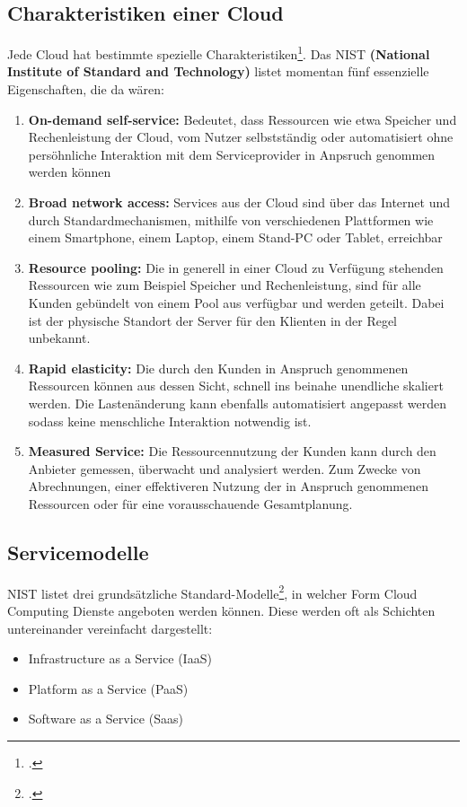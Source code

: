 \subsection{Charakteristiken einer Cloud}
Jede Cloud hat bestimmte spezielle Charakteristiken\footcite{cloud-computing}. Das NIST \textbf{(National Institute of Standard and Technology)} listet
momentan fünf essenzielle Eigenschaften, die da wären:
\begin{enumerate}
	\item \textbf{On-demand self-service: } Bedeutet, dass Ressourcen wie etwa Speicher und Rechenleistung der Cloud, vom Nutzer selbstständig oder automatisiert 
ohne persöhnliche Interaktion mit dem Serviceprovider in Anpsruch genommen werden können
	\item \textbf{Broad network access: } Services aus der Cloud sind über das Internet und durch Standardmechanismen, mithilfe von verschiedenen Plattformen wie einem Smartphone, einem Laptop, einem Stand-PC oder Tablet, erreichbar
	\item \textbf{Resource pooling: } Die in generell in einer Cloud zu Verfügung stehenden Ressourcen wie zum Beispiel Speicher und Rechenleistung, sind für alle Kunden gebündelt von einem Pool aus verfügbar und werden geteilt. Dabei ist der physische Standort der Server für den Klienten in der Regel unbekannt.
	\item \textbf{Rapid elasticity: } Die durch den Kunden in Anspruch genommenen Ressourcen können aus dessen Sicht, schnell ins beinahe unendliche skaliert werden. Die Lastenänderung
kann ebenfalls automatisiert angepasst werden sodass keine menschliche Interaktion notwendig ist.
	\item \textbf{Measured Service: } Die Ressourcennutzung der Kunden kann durch den Anbieter gemessen, überwacht und analysiert werden. Zum Zwecke von Abrechnungen, einer effektiveren
Nutzung der in Anspruch genommenen Ressourcen oder für eine vorausschauende Gesamtplanung.
\end{enumerate}

\subsection{Servicemodelle}
NIST listet drei grundsätzliche Standard-Modelle\footcite{cloud-servicemodelle}, in welcher Form Cloud Computing Dienste angeboten werden können. Diese werden oft als Schichten untereinander vereinfacht dargestellt:
\begin{itemize}
	\item Infrastructure as a Service (IaaS)
	\item Platform as a Service (PaaS)
	\item Software as a Service (Saas)
\end{itemize}

